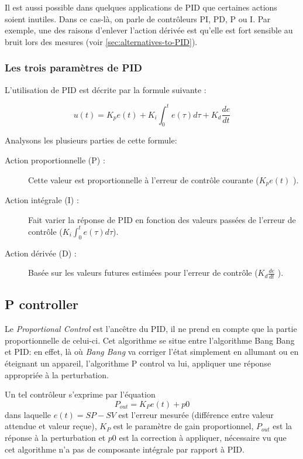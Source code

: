 \documentclass[a4paper,10pt]{report}
\begin{document}
Il est aussi possible dans quelques applications de PID que certaines actions soient inutiles.
Dans ce cas-là, on parle de contrôleurs PI, PD, P ou I.
Par exemple, une des raisons d'enlever l'action dérivée est qu'elle est fort sensible au bruit lors des mesures
(voir \ref{sec:alternatives-to-PID}).

\subsubsection{Les trois paramètres de PID}
L'utilisation de PID est décrite par la formule suivante\cite{visioli2006practical} :

$$u(t) = K_p e(t) + K_i \int_{0}^{t} e(\tau) d\tau + K_d \frac{de}{dt}$$

Analysons les plusieurs parties de cette formule:

\begin{description}
\item[Action proportionnelle (P) :]
    Cette valeur est proportionnelle à l'erreur de contrôle courante ($K_p e(t)$ ).
\item[Action intégrale (I) :]
    Fait varier la réponse de PID en fonction des valeurs passées de l'erreur de contrôle ($K_i \int_{0}^{t} e(\tau) d\tau$).
\item[Action dérivée (D) :]
    Basée sur les valeurs futures estimées pour l'erreur de contrôle ($K_d \frac{de}{dt}$ ).
\end{description}


\subsection{P controller}
Le \emph{Proportional Control} est l'ancêtre du PID, il ne prend en compte que la partie proportionnelle de celui-ci.
Cet algorithme se situe entre l'algorithme Bang Bang et PID:
en effet, là où \emph{Bang Bang} va corriger l'état simplement en allumant ou en éteignant un appareil, l'algorithme P control va lui, appliquer une réponse appropriée à la perturbation.

Un tel contrôleur s'exprime par l'équation
\begin{equation}P_{out} = K_{P}e(t) + p0\end{equation}
dans laquelle $e(t) = SP - SV$ est l'erreur mesurée (différence entre valeur attendue et valeur reçue), $K_{P}$ est le paramètre de gain proportionnel, $P_{out}$ est la réponse à la perturbation et $p0$ est la correction à appliquer, nécessaire vu que cet algorithme n'a pas de composante intégrale par rapport à PID.
\end{document}
